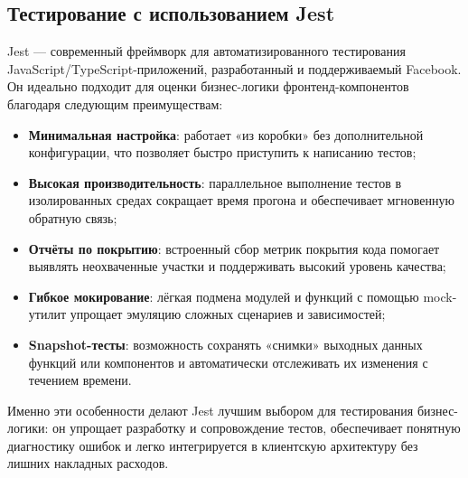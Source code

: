\subsection{Тестирование с использованием Jest}

Jest — современный фреймворк для автоматизированного тестирования JavaScript/TypeScript-приложений, разработанный и поддерживаемый Facebook. Он идеально подходит для оценки бизнес-логики фронтенд-компонентов благодаря следующим преимуществам:
\begin{itemize}
  \item \textbf{Минимальная настройка}: работает «из коробки» без дополнительной конфигурации, что позволяет быстро приступить к написанию тестов;
  \item \textbf{Высокая производительность}: параллельное выполнение тестов в изолированных средах сокращает время прогона и обеспечивает мгновенную обратную связь;
  \item \textbf{Отчёты по покрытию}: встроенный сбор метрик покрытия кода помогает выявлять неохваченные участки и поддерживать высокий уровень качества;
  \item \textbf{Гибкое мокирование}: лёгкая подмена модулей и функций с помощью mock-утилит упрощает эмуляцию сложных сценариев и зависимостей;
  \item \textbf{Snapshot-тесты}: возможность сохранять «снимки» выходных данных функций или компонентов и автоматически отслеживать их изменения с течением времени.
\end{itemize}

Именно эти особенности делают Jest лучшим выбором для тестирования бизнес-логики: он упрощает разработку и сопровождение тестов, обеспечивает понятную диагностику ошибок и легко интегрируется в клиентскую архитектуру без лишних накладных расходов.
